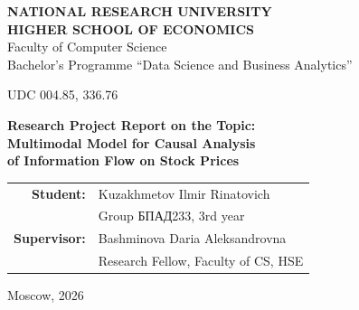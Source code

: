 \documentclass[12pt, a4paper]{article}
\begin{document}
\begin{titlepage}
    \begin{center}
        \textbf{NATIONAL RESEARCH UNIVERSITY}\\
        \textbf{HIGHER SCHOOL OF ECONOMICS}\\[4pt]
        Faculty of Computer Science\\
        Bachelor's Programme ``Data Science and Business Analytics''\\[4pt]
        \begin{flushleft}
        UDC 004.85, 336.76
        \end{flushleft}
        \vspace{-0.5cm}
        \vspace{40pt}

        \vfill

        {\Large \textbf{Research Project Report on the Topic:}}\\[20pt]

        {\LARGE \textbf{Multimodal Model for Causal Analysis\\of Information Flow on Stock Prices}}\\[40pt]

        \vfill

        \begin{flushright}
            \begin{tabular}{rl}
                \textbf{Student:}     & Kuzakhmetov Ilmir Rinatovich \\
                                      & Group БПАД233, 3rd year \\[8pt]
                \textbf{Supervisor:}  & Bashminova Daria Aleksandrovna \\
                                      & Research Fellow, Faculty of CS, HSE \\
            \end{tabular}
        \end{flushright}

        \vfill
        Moscow, 2026
    \end{center}
\end{titlepage}
\end{document}
